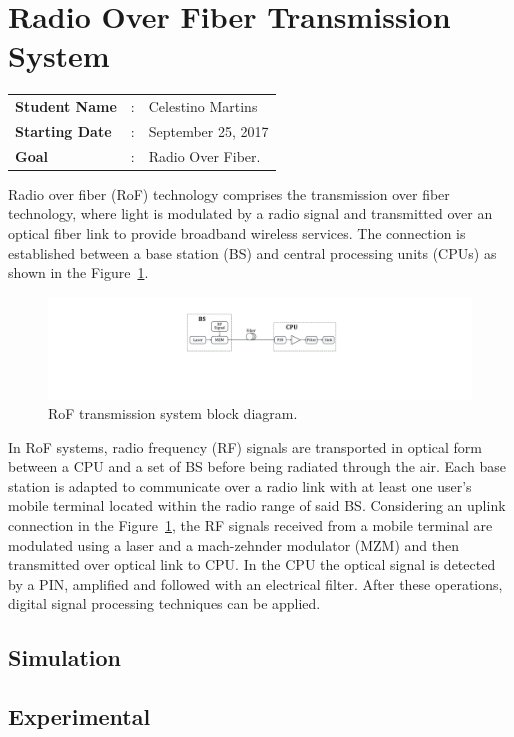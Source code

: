 \clearpage
\section{Radio Over Fiber Transmission System}

\begin{tcolorbox}	
\begin{tabular}{p{2.75cm} p{0.2cm} p{10.5cm}} 	
\textbf{Student Name}  &:& Celestino Martins\\
\textbf{Starting Date} &:& September 25, 2017\\
\textbf{Goal}          &:& Radio Over Fiber.
\end{tabular}
\end{tcolorbox}

Radio over fiber (RoF) technology comprises the transmission over fiber technology, where light is modulated by a radio signal and transmitted over an optical fiber link to provide broadband wireless services. The connection is established between a base station (BS) and central processing units (CPUs) as shown in the Figure~\ref{fig_RoFdiagram}.

\begin{figure}[h!]
    \centering
    \includegraphics[width=\linewidth]{./sdf/radio_over_fiber/figures/block_diagram.pdf}
    \caption{RoF transmission system block diagram.}
    \label{fig_RoFdiagram}
\end{figure}

In RoF systems, radio frequency (RF) signals are transported in optical form between a CPU and a set of BS before being radiated through the air. Each base station is adapted to communicate over a radio link with at least one user's mobile terminal located within the radio range of said BS.
Considering an uplink connection in the Figure~\ref{fig_RoFdiagram}, the RF signals received from a mobile terminal are modulated using a laser and a mach-zehnder modulator (MZM) and then transmitted over optical link to CPU. In the CPU the optical signal is detected by a PIN, amplified and followed with an electrical filter. After these operations, digital signal processing techniques can be applied. 


\subsection{Simulation}


\subsection{Experimental}
